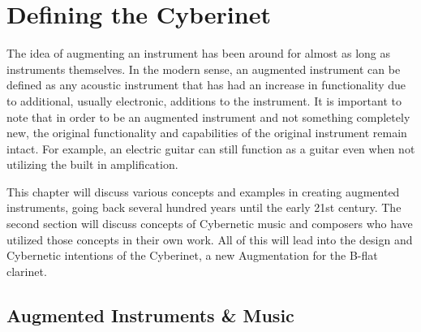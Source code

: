 


\chapter{Defining the Cyberinet}
The idea of augmenting an instrument has been around for almost as long as instruments themselves. In the modern sense, an augmented instrument can be defined as any acoustic instrument that has had an increase in functionality due to additional, usually electronic, additions to the instrument. It is important to note that in order to be an augmented instrument and not something completely new, the original functionality and capabilities of the original instrument remain intact.\cite{miranda_Wanderly_instrumentControl_2006} For example, an electric guitar can still function as a guitar even when not utilizing the built in amplification.

This chapter will discuss various concepts and examples in creating augmented instruments, going back several hundred years until the early 21st century. The second section will discuss concepts of Cybernetic music and composers who have utilized those concepts in their own work. All of this will lead into the design and Cybernetic intentions of the Cyberinet, a new Augmentation for the B-flat clarinet.


\section{Augmented Instruments \& Music}

